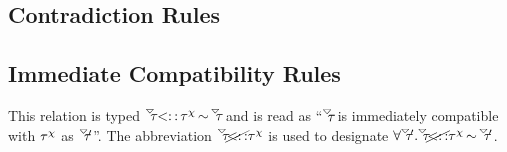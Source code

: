 \documentclass{article}
\begin{document}
\subsection*{Contradiction Rules}

\begin{mathpar}
    
    
    
    
    
    
\end{mathpar}

\subsection*{Immediate Compatibility Rules}

{\footnotesize This relation is typed $\tauDownOpen \immCompat \tauChi \icSeparator \tauDownOpen$ and is read as ``$\tauDownOpen$ is immediately compatible with $\tauChi$ as $\tauDownOpen'$''.  The abbreviation $\tauDownOpen \cancel{\immCompat} \tauChi$ is used to designate $\forall \tauDownOpen' . \tauDownOpen \cancel{\immCompat} \tauChi \icSeparator \tauDownOpen'$.}
\end{document}
